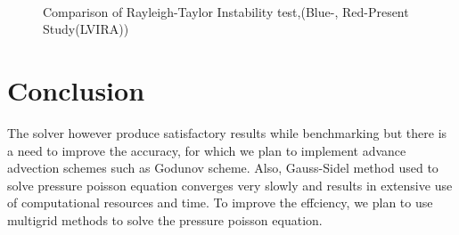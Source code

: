   \begin{figure}
 \centering
   \\
 \caption{Comparison of Rayleigh-Taylor Instability test,(Blue-\cite{Anton2001}, Red-Present Study(LVIRA))}
 \label{Fig:anton}
 \end{figure}
 
\section{Conclusion} 
 The solver however produce satisfactory results while benchmarking but there is a need to improve the accuracy,
 for which we plan to implement advance advection schemes such as Godunov scheme.
 Also, Gauss-Sidel method used to solve pressure poisson equation converges very slowly
 and results in extensive use of computational resources and time. 
 To improve the effciency, we plan to use multigrid methods to solve the pressure poisson equation.
 
 
 
 
 
 